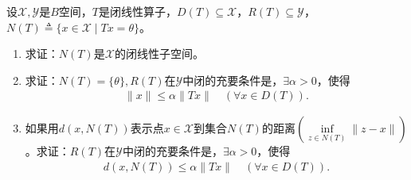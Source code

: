 \documentclass[../../main.tex]{subfiles}%
\begin{document}
\begin{example}
设$\mathscr{X},\mathscr{Y}$是$B$空间，$T$是闭线性算子，$D(T)\subseteq\mathscr{X}$，$R(T)\subseteq\mathscr{Y}$，$N(T)\triangleq\{x\in\mathscr{X}\mid Tx=\theta\}$。
\begin{enumerate}[(1)]
\item 求证：$N(T)$是$\mathscr{X}$的闭线性子空间。
\item 求证：$N(T)=\{\theta\},R(T)$在$\mathscr{Y}$中闭的充要条件是，$\exists\alpha>0$，使得
\begin{align*}
\|x\|\leqslant\alpha\|Tx\|\quad (\forall x\in D(T)).
\end{align*}
\item 如果用$d(x,N(T))$表示点$x\in\mathscr{X}$到集合$N(T)$的距离$\left(\inf\limits_{z\in N(T)}\|z-x\|\right)$。求证：$R(T)$在$\mathscr{Y}$中闭的充要条件是，$\exists\alpha>0$，使得
\begin{align*}
d(x,N(T))\leqslant\alpha\|Tx\|\quad (\forall x\in D(T)).
\end{align*}
\end{enumerate}
\end{example}
\end{document}
